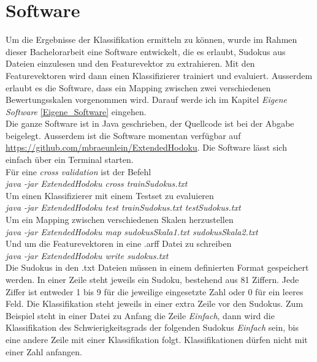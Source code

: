 \chapter{Software}
Um die Ergebnisse der Klassifikation ermitteln zu können, wurde im Rahmen dieser Bachelorarbeit eine Software entwickelt, die es erlaubt, Sudokus aus Dateien einzulesen und den Featurevektor zu extrahieren. Mit den Featurevektoren wird dann einen Klassifizierer trainiert und evaluiert. Ausserdem erlaubt es die Software, dass ein Mapping zwischen zwei verschiedenen Bewertungsskalen vorgenommen wird. Darauf werde ich im Kapitel \textit{Eigene Software} \ref{Eigene_Software} eingehen.\\
Die ganze Software ist in Java geschrieben, der Quellcode ist bei der Abgabe beigelegt. Ausserdem ist die Software momentan verfügbar auf \url{https://github.com/mbraeunlein/ExtendedHodoku}. Die Software lässt sich einfach über ein Terminal starten.\\[1em]
Für eine \textit{cross validation} ist der Befehl\\
\textit{java -jar ExtendedHodoku cross trainSudokus.txt}\\[1em]
Um einen Klassifizierer mit einem Testset zu evaluieren\\
\textit{java -jar ExtendedHodoku test trainSudokus.txt testSudokus.txt}\\[1em]
Um ein Mapping zwischen verschiedenen Skalen herzustellen\\
\textit{java -jar ExtendedHodoku map sudokusSkala1.txt sudokusSkala2.txt}\\[1em]
Und um die Featurevektoren in eine .arff Datei zu schreiben\\
\textit{java -jar ExtendedHodoku write sudokus.txt}\\[1em]
\label{Sudoku_Format}
Die Sudokus in den .txt Dateien müssen in einem definierten Format gespeichert werden. In einer Zeile steht jeweils ein Sudoku, bestehend aus 81 Ziffern. Jede Ziffer ist entweder 1 bis 9 für die jeweilige eingesetzte Zahl oder 0 für ein leeres Feld. Die Klassifikation steht jeweils in einer extra Zeile vor den Sudokus. Zum Beispiel steht in einer Datei zu Anfang die Zeile \textit{Einfach}, dann wird die Klassifikation des Schwierigkeitsgrads der folgenden Sudokus \textit{Einfach} sein, bis eine andere Zeile mit einer Klassifikation folgt. Klassifikationen dürfen nicht mit einer Zahl anfangen.
